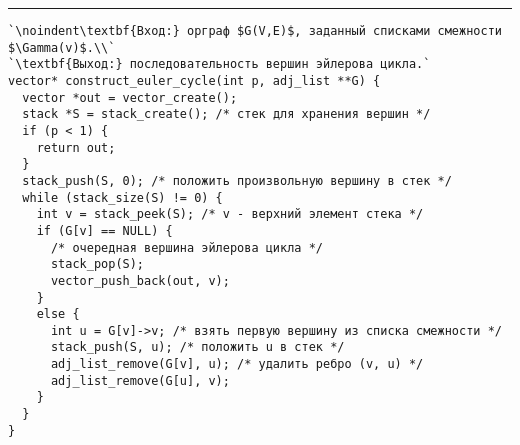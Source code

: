 \documentclass{article}
\begin{document}
\vspace{5pt} \hrule
\begin{lstlisting}[caption={Построение эйлерова цикла}, label=p341_euler_cycle, escapechar=`]
`\noindent\textbf{Вход:} орграф $G(V,E)$, заданный списками смежности $\Gamma(v)$.\\`
`\textbf{Выход:} последовательность вершин эйлерова цикла.`
vector* construct_euler_cycle(int p, adj_list **G) {
  vector *out = vector_create();
  stack *S = stack_create(); /* стек для хранения вершин */
  if (p < 1) {
    return out;
  }
  stack_push(S, 0); /* положить произвольную вершину в стек */
  while (stack_size(S) != 0) {
    int v = stack_peek(S); /* v - верхний элемент стека */
    if (G[v] == NULL) {
      /* очередная вершина эйлерова цикла */
      stack_pop(S);
      vector_push_back(out, v);
    }
    else {
      int u = G[v]->v; /* взять первую вершину из списка смежности */
      stack_push(S, u); /* положить u в стек */
      adj_list_remove(G[v], u); /* удалить ребро (v, u) */
      adj_list_remove(G[u], v);
    }
  }
}
\end{lstlisting}
\end{document}
